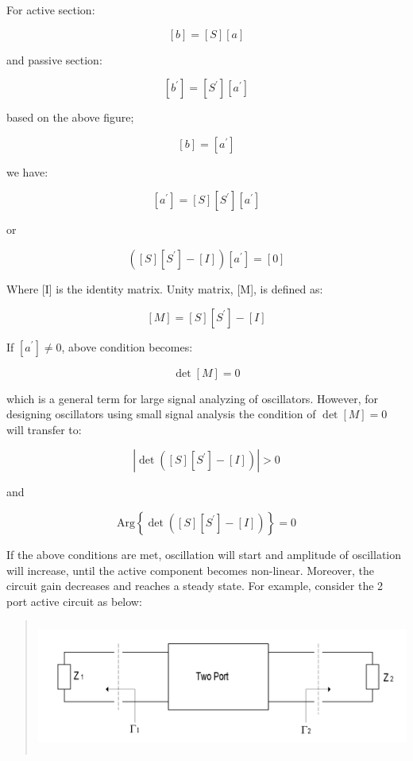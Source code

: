 For active section:

\[\left\lbrack b \right\rbrack = \left\lbrack S \right\rbrack\left\lbrack a \right\rbrack\]

and passive section:

\[\left\lbrack b^{'} \right\rbrack = \left\lbrack S^{'} \right\rbrack\left\lbrack a^{'} \right\rbrack\]

based on the above figure;

\[\left\lbrack b \right\rbrack = \left\lbrack a^{'} \right\rbrack\]

we have:

\[\left\lbrack a^{'} \right\rbrack = \left\lbrack S \right\rbrack\left\lbrack S^{'} \right\rbrack\left\lbrack a^{'} \right\rbrack\]

or

\[\left( \left\lbrack S \right\rbrack\left\lbrack S^{'} \right\rbrack - \left\lbrack I \right\rbrack \right)\left\lbrack a^{'} \right\rbrack = \left\lbrack 0 \right\rbrack\]

Where {[}I{]} is the identity matrix. Unity matrix, {[}M{]}, is defined
as:

\[\left\lbrack M \right\rbrack = \left\lbrack S \right\rbrack\left\lbrack S^{'} \right\rbrack - \left\lbrack I \right\rbrack\]

If \(\left\lbrack a^{'} \right\rbrack \neq 0\), above condition becomes:

\[\det\left\lbrack M \right\rbrack = 0\]

which is a general term for large signal analyzing of oscillators.
However, for designing oscillators using small signal analysis the
condition of \(\det\left\lbrack M \right\rbrack = 0\) will transfer to:

\[\left| \det\left( \left\lbrack S \right\rbrack\left\lbrack S^{'} \right\rbrack - \left\lbrack I \right\rbrack \right) \right| > 0\]

and

\[\text{Arg}\left\{ \det\left( \left\lbrack S \right\rbrack\left\lbrack S^{'} \right\rbrack - \left\lbrack I \right\rbrack \right) \right\} = 0\]

If the above conditions are met, oscillation will start and amplitude of
oscillation will increase, until the active component becomes
non-linear. Moreover, the circuit gain decreases and reaches a steady
state. For example, consider the 2 port active circuit as below:

\begin{quote}
\includegraphics[width=5.52778in,height=1.70833in]{media/image11.png}
\end{quote}

